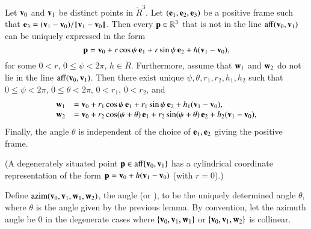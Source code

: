 \begin{lemma}
Let ${\mathbf v}_0$ and ${\mathbf v}_1$ be distinct points in 
$\ring{R}^3$.  Let $({\mathbf e}_1,{\mathbf e}_2,{\mathbf e}_3)$ be a positive frame 
such that ${\mathbf e}_3 = ({\mathbf v}_1-{\mathbf v}_0)/{\hskip0.1em|\hskip-0.15em|\hskip0.1em}{\mathbf v}_1 - {\mathbf v}_0{\hskip0.1em|\hskip-0.15em|\hskip0.1em}$.
Then every
${\mathbf p}\in\mathbb{R}^3$ that is not in the line ${\operatorname{aff}}({\mathbf v}_0,{\mathbf v}_1)$
can be uniquely expressed in the form
   \begin{displaymath}
   {\mathbf p} = {\mathbf v}_0 + r\cos\psi\, {\mathbf e}_1 + r\sin\psi\, {\mathbf e}_2 + h ({\mathbf v}_1-{\mathbf v}_0),
   \end{displaymath}
%
%
for some $0< r$, $0\le \psi < 2\pi$, $h\in\ring{R}$.
Furthermore,
assume that ${\mathbf w}_1$ and ${\mathbf w}_2$ do
not lie in the line ${\operatorname{aff}}({\mathbf v}_0,{\mathbf v}_1)$.
Then there exist unique $\psi,\theta,r_1,r_2,h_1,h_2$
 such
that $0\le\psi<2\pi$, $0\le\theta < 2\pi$, $0 < r_1$, $0 < r_2$, and
  \begin{displaymath}
  \begin{array}{lll}
    {\mathbf w}_1 &= {\mathbf v}_0 + r_1\cos\psi\, {\mathbf e}_1 + r_1\sin\psi\, {\mathbf e}_2 + h_1({\mathbf v}_1-{\mathbf v}_0),\\
    {\mathbf w}_2 &= {\mathbf v}_0 + r_2\cos(\psi+\theta)\, {\mathbf e}_1 + r_2\sin(\psi+\theta)\, {\mathbf e}_2 
     + h_2({\mathbf v}_1-{\mathbf v}_0),\\
\end{array}
  \end{displaymath}
Finally, the angle $\theta$ is independent of the choice of ${\mathbf e}_1,{\mathbf e}_2$
giving the positive frame.
\end{lemma}
%
%
%
%
%
%
(A degenerately situated point ${\mathbf p}\in{\operatorname{aff}}\{{\mathbf v}_0,{\mathbf v}_1\}$ has a cylindrical coordinate
representation of the form ${\mathbf p} = {\mathbf v}_0 + h({\mathbf v}_1-{\mathbf v}_0)$ (with $r=0$).)


%

\begin{definition}[azim] 
Define ${\operatorname{azim}}({\mathbf v}_0,{\mathbf v}_1,{\mathbf w}_1,{\mathbf w}_2)$, the  angle (or ), 
to be the uniquely determined
angle $\theta$, where $\theta$ is the angle given by the previous
lemma.  By convention, let the azimuth angle be $0$ in the degenerate cases where
$\{{\mathbf v}_0,{\mathbf v}_1,{\mathbf w}_1\}$ or $\{{\mathbf v}_0,{\mathbf v}_1,{\mathbf w}_2\}$ is collinear.
%
%
%
\end{definition}

